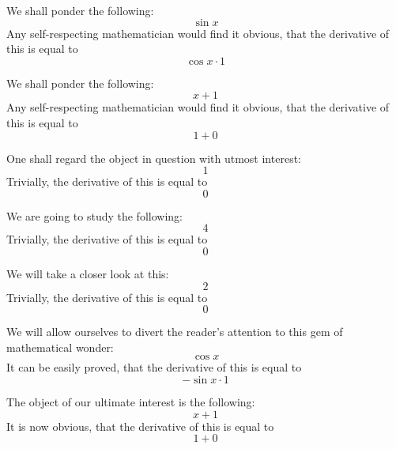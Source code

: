 \documentclass{article}
\begin{document}
We shall ponder the following:
\begin{equation}
\sin x 
\end{equation}
Any self-respecting mathematician would find it obvious, that the derivative of this is equal to
\begin{equation}
\cos x \cdot 1 
\end{equation}

We shall ponder the following:
\begin{equation}
x + 1 
\end{equation}
Any self-respecting mathematician would find it obvious, that the derivative of this is equal to
\begin{equation}
1 + 0 
\end{equation}

One shall regard the object in question with utmost interest:
\begin{equation}
1 
\end{equation}
Trivially, the derivative of this is equal to
\begin{equation}
0 
\end{equation}

We are going to study the following:
\begin{equation}
4 
\end{equation}
Trivially, the derivative of this is equal to
\begin{equation}
0 
\end{equation}

We will take a closer look at this:
\begin{equation}
2 
\end{equation}
Trivially, the derivative of this is equal to
\begin{equation}
0 
\end{equation}

We will allow ourselves to divert the reader's attention to this gem of mathematical wonder:
\begin{equation}
\cos x 
\end{equation}
It can be easily proved, that the derivative of this is equal to
\begin{equation}
-\sin x \cdot 1 
\end{equation}

The object of our ultimate interest is the following:
\begin{equation}
x + 1 
\end{equation}
It is now obvious, that the derivative of this is equal to
\begin{equation}
1 + 0 
\end{equation}
\end{document}
